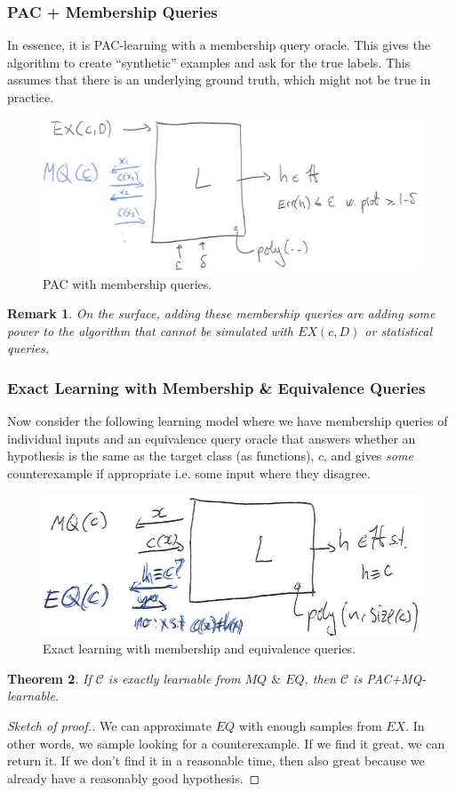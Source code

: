 \documentclass[12pt, letterpaper]{article}
\numberwithin{equation}{section} %
\newcommand{\mc}{\mathcal}
\newtheorem{theorem}{Theorem}[section]
\newtheorem{remark}[theorem]{Remark}
\theoremstyle{definition}
\theoremstyle{remark}
\begin{document}
\subsubsection*{PAC + Membership Queries}
In essence, it is PAC-learning with a membership query oracle. This gives the algorithm to create ``synthetic'' examples and ask for the true labels. This assumes that there is an underlying ground truth, which might not be true in practice.
\begin{figure}[H]
\centering
\includegraphics[width=0.6\linewidth]{img/pac-mq.png}
\caption{PAC with membership queries.}
\end{figure}
\begin{remark}
On the surface, adding these membership queries are adding some power to the algorithm that cannot be simulated with $EX(c, D)$ or statistical queries.
\end{remark}
\subsubsection*{Exact Learning with Membership \& Equivalence Queries}
Now consider the following learning model where we have membership queries of individual inputs and an equivalence query oracle that answers whether an hypothesis is the same as the target class (as functions), $c$, and gives \emph{some} counterexample if appropriate i.e. some input where they disagree.
\begin{figure}[H]
\centering
\includegraphics[width=0.6\linewidth]{img/pac-mq-eq.png}
\caption{Exact learning with membership and equivalence queries.}
\end{figure}

\begin{theorem}
If $\mc C$ is exactly learnable from $MQ$ $\&$ $EQ$, then $\mc C$ is PAC+MQ-learnable.
\end{theorem}
\begin{proof}[Sketch of proof.]
We can approximate $EQ$ with enough samples from $EX$. In other words, we sample looking for a counterexample. If we find it great, we can return it. If we don't find it in a reasonable time, then also great because we already have a reasonably good hypothesis.
\end{proof}
\end{document}
